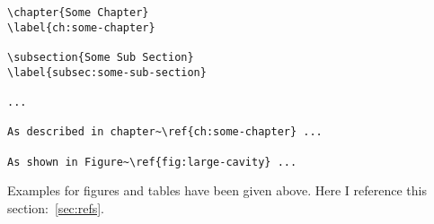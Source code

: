 \begin{verbatim}
\chapter{Some Chapter}
\label{ch:some-chapter}

\subsection{Some Sub Section}
\label{subsec:some-sub-section}

...

As described in chapter~\ref{ch:some-chapter} ...

As shown in Figure~\ref{fig:large-cavity} ...
\end{verbatim}

Examples for figures and tables have been given above.  Here I
reference this section:~\ref{sec:refs}.  

